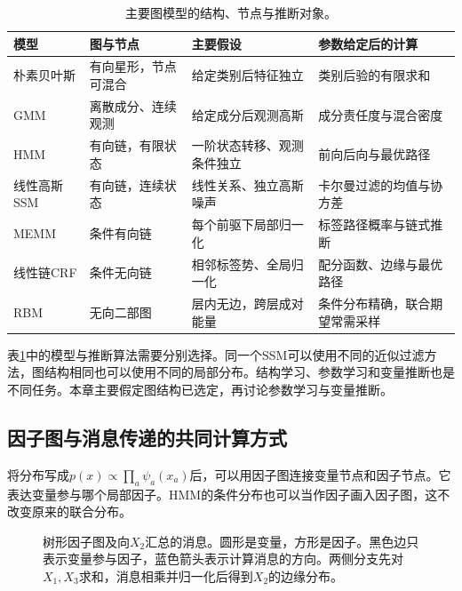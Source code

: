 \begin{table}[htbp]
\centering
\caption{主要图模型的结构、节点与推断对象。}
\label{tab:bayes-model-assumptions}
\small
\begin{tabular}{m{1.7cm}m{1.8cm}m{3.5cm}m{3.5cm}}
\hline
模型 & 图与节点 & 主要假设 & 参数给定后的计算 \\
\hline
朴素贝叶斯 & 有向星形，节点可混合 & 给定类别后特征独立 & 类别后验的有限求和 \\
GMM & 离散成分、连续观测 & 给定成分后观测高斯 & 成分责任度与混合密度 \\
HMM & 有向链，有限状态 & 一阶状态转移、观测条件独立 & 前向后向与最优路径 \\
线性高斯SSM & 有向链，连续状态 & 线性关系、独立高斯噪声 & 卡尔曼过滤的均值与协方差 \\
MEMM & 条件有向链 & 每个前驱下局部归一化 & 标签路径概率与链式推断 \\
线性链CRF & 条件无向链 & 相邻标签势、全局归一化 & 配分函数、边缘与最优路径 \\
RBM & 无向二部图 & 层内无边，跨层成对能量 & 条件分布精确，联合期望常需采样 \\
\hline
\end{tabular}
\end{table}

表\ref{tab:bayes-model-assumptions}中的模型与推断算法需要分别选择。同一个SSM可以使用不同的近似过滤方法，图结构相同也可以使用不同的局部分布。结构学习、参数学习和变量推断也是不同任务。本章主要假定图结构已选定，再讨论参数学习与变量推断。

\subsection{因子图与消息传递的共同计算方式}
将分布写成$p(x)\propto\prod_a\psi_a(x_a)$后，可以用因子图连接变量节点和因子节点。它表达变量参与哪个局部因子。HMM的条件分布也可以当作因子画入因子图，这不改变原来的联合分布。

\begin{figure}[htbp]
\centering
{}
\caption{树形因子图及向$X_2$汇总的消息。圆形是变量，方形是因子。黑色边只表示变量参与因子，蓝色箭头表示计算消息的方向。两侧分支先对$X_1,X_3$求和，消息相乘并归一化后得到$X_2$的边缘分布。}
\label{fig:bayes-factor-messages}
\end{figure}

